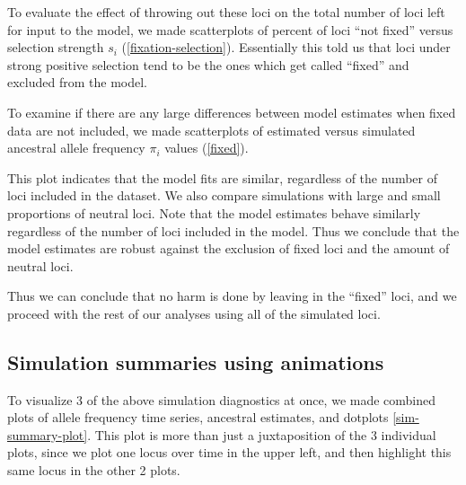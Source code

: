 \documentclass[a4paper,12pt]{article}
\begin{document}
To evaluate the effect of throwing out these loci on the total number
of loci left for input to the model, we made scatterplots of percent
of loci ``not fixed'' versus selection strength $s_i$
(\autoref{fixation-selection}). Essentially this told us that loci
under strong positive selection tend to be the ones which get called
``fixed'' and excluded from the model.


To examine if there are any large differences between model estimates
when fixed data are not included, we made scatterplots of estimated
versus simulated ancestral allele frequency $\pi_i$ values
(\autoref{fixed}).


This plot indicates that the model fits are similar, regardless of the
number of loci included in the dataset. We also compare simulations
with large and small proportions of neutral loci. Note that the model
estimates behave similarly regardless of the number of loci included
in the model. Thus we conclude that the model estimates are robust
against the exclusion of fixed loci and the amount of neutral loci.

Thus we can conclude that no harm is done by leaving in the ``fixed''
loci, and we proceed with the rest of our analyses using all of the
simulated loci.

\subsection{Simulation summaries using animations}

To visualize 3 of the above simulation diagnostics at once, we made
combined plots of allele frequency time series, ancestral estimates,
and dotplots \autoref{sim-summary-plot}. This plot is more than just a
juxtaposition of the 3 individual plots, since we plot one locus over
time in the upper left, and then highlight this same locus in the
other 2 plots.

\end{document}
